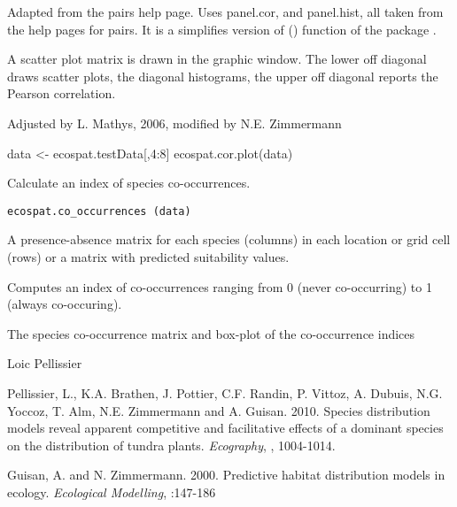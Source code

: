 \documentclass[a4paper]{book}
\begin{document}
%
\begin{Details}\relax
Adapted from the pairs help page. Uses panel.cor, and panel.hist, all taken from the help pages for pairs. It is a simplifies version of () function of the package .
\end{Details}
%
\begin{Value}
A scatter plot matrix is drawn in the graphic window. The lower off diagonal draws scatter plots, the diagonal histograms, the upper off diagonal reports the Pearson correlation.
\end{Value}
%
\begin{Author}\relax
Adjusted by L. Mathys, 2006, modified by N.E. Zimmermann
\end{Author}
%
\begin{Examples}
\begin{ExampleCode}
data <- ecospat.testData[,4:8]
ecospat.cor.plot(data)
\end{ExampleCode}
\end{Examples}
%
\begin{Description}\relax
Calculate an index of species co-occurrences.
\end{Description}
%
\begin{Usage}
\begin{verbatim}
ecospat.co_occurrences (data)
\end{verbatim}
\end{Usage}
%
\begin{Arguments}
\begin{ldescription}
\item[\code{data}] A presence-absence matrix for each species (columns) in each location or grid cell (rows) or a matrix with predicted suitability values. 
\end{ldescription}
\end{Arguments}
%
\begin{Details}\relax
Computes an index of co-occurrences ranging from 0 (never co-occurring) to 1 (always co-occuring).
\end{Details}
%
\begin{Value}
The species co-occurrence matrix and box-plot of the co-occurrence indices
\end{Value}
%
\begin{Author}\relax
Loic Pellissier 
\end{Author}
%
\begin{References}\relax
Pellissier, L., K.A. Brathen, J. Pottier, C.F. Randin, P. Vittoz, A. Dubuis, N.G. Yoccoz, T. Alm, N.E. Zimmermann and A. Guisan. 2010. Species distribution models reveal apparent competitive and facilitative effects of a dominant species on the distribution of tundra plants. \emph{Ecography}, , 1004-1014.

Guisan, A. and N. Zimmermann. 2000. Predictive habitat distribution models in ecology. \emph{Ecological Modelling}, :147-186
\end{References}
\end{document}
